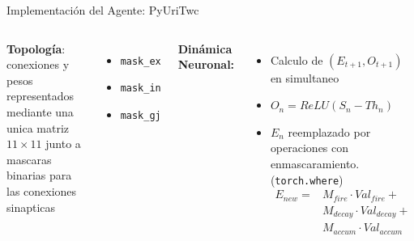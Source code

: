 \begin{frame}{Implementación del Agente: PyUriTwc}
  \begin{columns}[T,onlytextwidth]

        \textbf{Topología}: conexiones y pesos representados mediante una unica matriz $11 \times 11$ junto a mascaras binarias para las conexiones sinapticas
        \begin{itemize}
            \item \texttt{mask\_ex}
            \item \texttt{mask\_in}
            \item \texttt{mask\_gj}
        \end{itemize}

    \pause
        \textbf{Dinámica Neuronal:}
        \begin{itemize}
            \item Calculo de $(E_{t+1},O_{t+1})$ en simultaneo
            \item $O_n = ReLU(S_n - Th_n)$
            \item $E_n$ reemplazado por operaciones con enmascaramiento. (\texttt{torch.where})
            \vspace{0.1cm}
            $$
            \begin{aligned}    
                E_{new} = &M_{fire} \cdot Val_{fire} + \\
                          &M_{decay} \cdot Val_{decay} + \\
                          &M_{accum} \cdot Val_{accum}
            \end{aligned}
            $$
        \end{itemize}

  \end{columns}
\end{frame}
